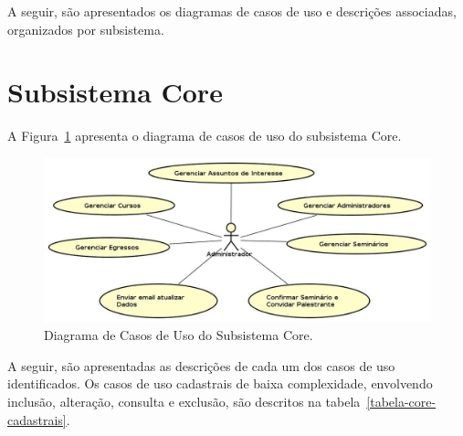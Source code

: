 A seguir, são apresentados os diagramas de casos de uso e descrições associadas, organizados por subsistema.


\newpage
\section{Subsistema Core}

A Figura~\ref{figura-caso-de-uso-core} apresenta o diagrama de casos de uso do subsistema Core.

\begin{figure}[h!]
	\centering
	\includegraphics[width=1\textwidth]{figuras/casodeuso-core}
 	\caption{Diagrama de Casos de Uso do Subsistema Core.}
 	\label{figura-caso-de-uso-core}
\end{figure}
 
 A seguir, são apresentadas as descrições de cada um dos casos de uso identificados. Os casos de uso cadastrais de baixa complexidade, envolvendo inclusão, alteração, consulta e exclusão, são descritos na tabela~\ref{tabela-core-cadastrais}.


